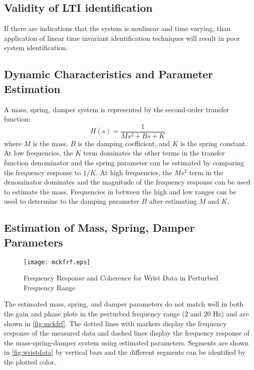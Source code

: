 \documentclass[11pt,a4paper]{article}
\begin{document}
\subsection{Validity of LTI identification}
If there are indications that the system is nonlinear and time varying, than
application of linear time invariant identification techniques will result in
poor system identification.

\subsection{Dynamic Characteristics and Parameter Estimation}
A mass, spring, damper system is represented by the second-order transfer
function:
\begin{equation*}
    H(s) = \frac{1}{Ms^2 + Bs + K}
\end{equation*}
where $M$ is the mass, $B$ is the damping coefficient, and $K$ is the spring
constant. At low frequencies, the $K$ term dominates the other terms in the
transfer function denominator and the spring parameter can be estimated by
comparing the frequency response to $1/K$. At high frequencies, the $Ms^2$ term
in the denominator dominates and the magnitude of the frequency response can be
used to estimate the mass. Frequencies in between the high and low ranges can
be used to determine to the damping parameter $B$ after estimating $M$ and $K$.

\subsection{Estimation of Mass, Spring, Damper Parameters}
\begin{figure}
    \centering
    \texttt{[image: mckfrf.eps]}
    \caption{Frequency Response and Coherence for Wrist Data in Perturbed
        Frequency Range}
    \label{fig:mckfrf}
\end{figure}
The estimated mass, spring, and damper parameters do not match well in both the
gain and phase plots in the perturbed frequency range ($2$ and $20$ Hz) and are
shown in \autoref{fig:mckfrf}. The dotted lines with markers display the
frequency response of the measured data and dashed lines display the frequency
response of the mass-spring-damper system using estimated parameters. Segments
are shown in \autoref{fig:wristdata} by vertical bars and the different
segments can be identified by the plotted color.

\end{document}
